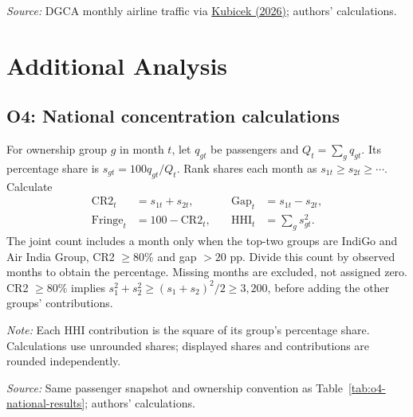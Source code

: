 \documentclass[12pt,a4paper]{article}
\begin{document}
\medskip
\begin{minipage}{\linewidth}
\captionsetup{font=small,labelfont=bf,justification=raggedright,singlelinecheck=false,hypcap=false}
\label{tab:o4-capacity-inputs}
\centering
{\small{}\par}
\vspace{4pt}
{\footnotesize{}\raggedright\textit{Source:} DGCA monthly airline traffic via \href{https://github.com/mkubicek/india-aviation-stats/tree/16770ac59dae61ce7b80fd8bd67dd7f4cef280a6}{Kubicek (2026)}; authors' calculations.\par}
\end{minipage}

\clearpage
\section{Additional Analysis}
\label{app:o4-route-preparation}
\subsection{O4: National concentration calculations}
\label{app:o4-national-calculations}
For ownership group $g$ in month $t$, let $q_{gt}$ be passengers and $Q_t=\sum_g q_{gt}$. Its percentage share is $s_{gt}=100q_{gt}/Q_t$. Rank shares each month as $s_{1t}\geq s_{2t}\geq\cdots$. Calculate
\[
\begin{aligned}
\mathrm{CR2}_t&=s_{1t}+s_{2t}, &\quad \mathrm{Gap}_t&=s_{1t}-s_{2t},\\
\mathrm{Fringe}_t&=100-\mathrm{CR2}_t, &\quad \mathrm{HHI}_t&=\sum_g s_{gt}^{2}.
\end{aligned}
\]
The joint count includes a month only when the top-two groups are IndiGo and Air India Group, CR2 $\geq80\%$ and gap $>20$ pp. Divide this count by observed months to obtain the percentage. Missing months are excluded, not assigned zero. CR2 $\geq80\%$ implies $s_1^2+s_2^2\geq(s_1+s_2)^2/2\geq3{,}200$, before adding the other groups' contributions.

\begin{minipage}{\linewidth}
\captionsetup{font=small,labelfont=bf,justification=raggedright,singlelinecheck=false,hypcap=false}
\label{tab:o4-national-worked}
\centering
{\small{}\par}
\vspace{4pt}
{\footnotesize{}\raggedright\textit{Note:} Each HHI contribution is the square of its group's percentage share. Calculations use unrounded shares; displayed shares and contributions are rounded independently.\par
\textit{Source:} Same passenger snapshot and ownership convention as Table~\ref{tab:o4-national-results}; authors' calculations.\par}
\end{minipage}
\end{document}
